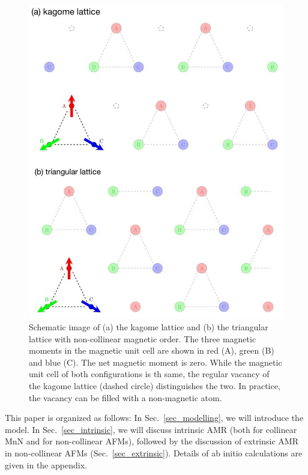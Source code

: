 \documentclass[prb,showpacs,amsmath,amssymb,superscriptaddress,twocolumn,floatfix]{revtex4-1}
\begin{document}
\begin{figure}
	\centering
	\includegraphics[width=1\linewidth]{img/kagome_triangular_11.jpg}
	\caption{Schematic image of (a) the kagome lattice and (b) the triangular lattice with non-collinear magnetic order. The three magnetic moments in the magnetic unit cell are shown in red (A), green (B) and blue (C). The net magnetic moment is zero. While the magnetic unit cell of both configurations is th same, the regular vacancy of the kagome lattice (dashed circle) distinguishes the two. In practice, the vacancy can be filled with a non-magnetic atom.}
	\label{fig:kagome_triangular}
\end{figure}


This paper is organized as follows: In Sec.~\ref{sec_modelling}, we
will introduce the model. In Sec.~\ref{sec_intrinsic}, we will discuss
intrinsic AMR (both for collinear MnN and for non-collinear AFMs),
followed by the discussion of extrinsic AMR in non-collinear AFMs
(Sec.~\ref{sec_extrinsic}). Details of ab initio calculations are
given in the appendix.
\end{document}
